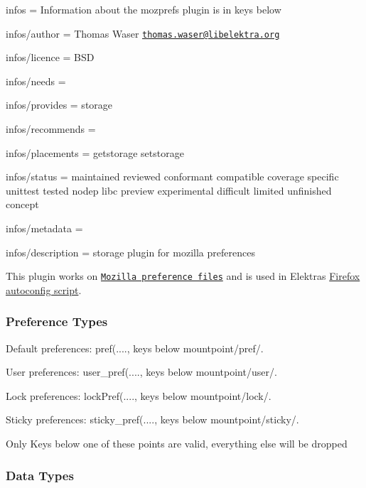 
\begin{DoxyItemize}
\item infos = Information about the mozprefs plugin is in keys below
\item infos/author = Thomas Waser \href{mailto:thomas.waser@libelektra.org}{\tt thomas.\+waser@libelektra.\+org}
\item infos/licence = B\+S\+D
\item infos/needs =
\item infos/provides = storage
\item infos/recommends =
\item infos/placements = getstorage setstorage
\item infos/status = maintained reviewed conformant compatible coverage specific unittest tested nodep libc preview experimental difficult limited unfinished concept
\item infos/metadata =
\item infos/description = storage plugin for mozilla preferences
\end{DoxyItemize}

This plugin works on \href{https://developer.mozilla.org/en-US/docs/Mozilla/Preferences/A_brief_guide_to_Mozilla_preferences}{\tt Mozilla preference files} and is used in Elektras \hyperlink{md_src_plugins_mozprefs_autoconfig_README_src_plugins_mozprefs_autoconfig_README_md}{Firefox autoconfig script}.

\subsubsection*{Preference Types}


\begin{DoxyItemize}
\item Default preferences\+: {\ttfamily pref(....}, keys below {\ttfamily mountpoint/pref/}.
\item User preferences\+: {\ttfamily user\+\_\+pref(....}, keys below {\ttfamily mountpoint/user/}.
\item Lock preferences\+: {\ttfamily lock\+Pref(....}, keys below {\ttfamily mountpoint/lock/}.
\item Sticky preferences\+: {\ttfamily sticky\+\_\+pref(....}, keys below {\ttfamily mountpoint/sticky/}.
\end{DoxyItemize}

Only Keys below one of these points are valid, everything else will be dropped

\subsubsection*{Data Types}


